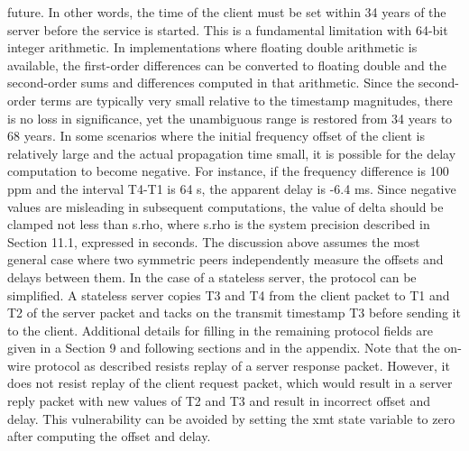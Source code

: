  future. In other words, the time of the client must be set within 34
 years of the server before the service is started. This is a
 fundamental limitation with 64-bit integer arithmetic.
 In implementations where floating double arithmetic is available, the
 first-order differences can be converted to floating double and the
 second-order sums and differences computed in that arithmetic. Since
 the second-order terms are typically very small relative to the
 timestamp magnitudes, there is no loss in significance, yet the
 unambiguous range is restored from 34 years to 68 years.
 In some scenarios where the initial frequency offset of the client is
 relatively large and the actual propagation time small, it is
 possible for the delay computation to become negative. For instance,
 if the frequency difference is 100 ppm and the interval T4-T1 is 64
 s, the apparent delay is -6.4 ms. Since negative values are
 misleading in subsequent computations, the value of delta should be
 clamped not less than s.rho, where s.rho is the system precision
 described in Section 11.1, expressed in seconds.
 The discussion above assumes the most general case where two
 symmetric peers independently measure the offsets and delays between
 them. In the case of a stateless server, the protocol can be
 simplified. A stateless server copies T3 and T4 from the client
 packet to T1 and T2 of the server packet and tacks on the transmit
 timestamp T3 before sending it to the client. Additional details for
 filling in the remaining protocol fields are given in a Section 9 and
 following sections and in the appendix.
 Note that the on-wire protocol as described resists replay of a
 server response packet. However, it does not resist replay of the
 client request packet, which would result in a server reply packet
 with new values of T2 and T3 and result in incorrect offset and
 delay. This vulnerability can be avoided by setting the xmt state
 variable to zero after computing the offset and delay.
